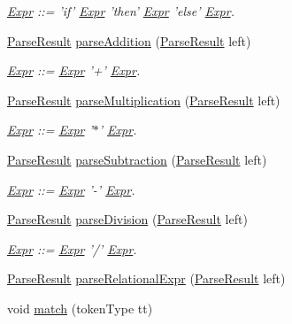 \begin{DoxyCompactItemize}
\begin{DoxyCompactList}\small\item\em \hyperlink{classExpr}{Expr} \-:\-:= 'if' \hyperlink{classExpr}{Expr} 'then' \hyperlink{classExpr}{Expr} 'else' \hyperlink{classExpr}{Expr}. \end{DoxyCompactList}\item 
\hyperlink{classParseResult}{Parse\-Result} \hyperlink{classParser_ae09cb2b5a7f80c6ad4ad9ccf27a746ca}{parse\-Addition} (\hyperlink{classParseResult}{Parse\-Result} left)
\begin{DoxyCompactList}\small\item\em \hyperlink{classExpr}{Expr} \-:\-:= \hyperlink{classExpr}{Expr} '+' \hyperlink{classExpr}{Expr}. \end{DoxyCompactList}\item 
\hyperlink{classParseResult}{Parse\-Result} \hyperlink{classParser_a52e6a57d53fc98e5819cc51b3cbe5bd5}{parse\-Multiplication} (\hyperlink{classParseResult}{Parse\-Result} left)
\begin{DoxyCompactList}\small\item\em \hyperlink{classExpr}{Expr} \-:\-:= \hyperlink{classExpr}{Expr} '$\ast$' \hyperlink{classExpr}{Expr}. \end{DoxyCompactList}\item 
\hyperlink{classParseResult}{Parse\-Result} \hyperlink{classParser_ac22cf1f77e0ca4c23942d5cbcc47eb37}{parse\-Subtraction} (\hyperlink{classParseResult}{Parse\-Result} left)
\begin{DoxyCompactList}\small\item\em \hyperlink{classExpr}{Expr} \-:\-:= \hyperlink{classExpr}{Expr} '-\/' \hyperlink{classExpr}{Expr}. \end{DoxyCompactList}\item 
\hyperlink{classParseResult}{Parse\-Result} \hyperlink{classParser_ad05e6cd1bf83179ecb727b83cbbd0c4e}{parse\-Division} (\hyperlink{classParseResult}{Parse\-Result} left)
\begin{DoxyCompactList}\small\item\em \hyperlink{classExpr}{Expr} \-:\-:= \hyperlink{classExpr}{Expr} '/' \hyperlink{classExpr}{Expr}. \end{DoxyCompactList}\item 
\hyperlink{classParseResult}{Parse\-Result} \hyperlink{classParser_ab42ecabc4dbe601d5ed9667351c0c0b8}{parse\-Relational\-Expr} (\hyperlink{classParseResult}{Parse\-Result} left)
\item 
\hypertarget{classParser_a3199aab5275c8b6477245eb866fabf35}{void \hyperlink{classParser_a3199aab5275c8b6477245eb866fabf35}{match} (token\-Type tt)}\label{classParser_a3199aab5275c8b6477245eb866fabf35}


\end{DoxyCompactItemize}
